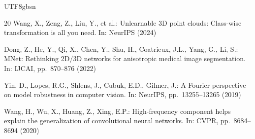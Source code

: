 \documentclass[a4paper,11pt]{article}
\begin{document}
\begin{CJK}{UTF8}{gbsn}
\begin{thebibliography}{20}
Wang, X., Zeng, Z., Liu, Y., et al.:
Unlearnable 3D point clouds: Class-wise transformation is all you need.
In: NeurIPS (2024)

Dong, Z., He, Y., Qi, X., Chen, Y., Shu, H., Coatrieux, J.L., Yang, G., Li, S.:
MNet: Rethinking 2D/3D networks for anisotropic medical image segmentation.
In: IJCAI, pp.~870--876 (2022)

Yin, D., Lopes, R.G., Shlens, J., Cubuk, E.D., Gilmer, J.:
A Fourier perspective on model robustness in computer vision.
In: NeurIPS, pp.~13255--13265 (2019)

Wang, H., Wu, X., Huang, Z., Xing, E.P.:
High-frequency component helps explain the generalization of convolutional neural networks.
In: CVPR, pp.~8684--8694 (2020)

\end{thebibliography}

\end{CJK}
\end{document}
